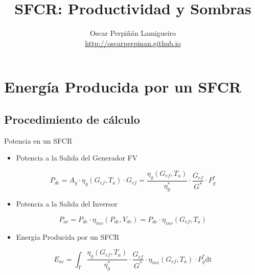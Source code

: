 \documentclass[xcolor={usenames,svgnames,dvipsnames}]{beamer}
\author{Oscar Perpiñán Lamigueiro \\ \url{http://oscarperpinan.github.io}}
\date{}
\title{SFCR: Productividad y Sombras}
\begin{document}
\maketitle

\section{Energía Producida por un SFCR}
\label{sec-1}

\subsection{Procedimiento de cálculo}
\label{sec-1-1}

\begin{frame}[label=sec-1-1-1]{Potencia en un SFCR}
\begin{itemize}
\item Potencia a la Salida del Generador FV
\end{itemize}

$$P_{dc} = A_g \cdot \eta_g(G_{ef}, T_a) \cdot  G_{ef} = %
      \frac{\eta_g(G_{ef}, T_a)}{\eta_g^*} \cdot \frac{G_{ef}}{G^*} \cdot P_g^*$$

\begin{itemize}
\item Potencia a la Salida del Inversor
\end{itemize}

$$P_{ac} = P_{dc} \cdot \eta_{inv}(P_{dc}, V_{dc}) =  P_{dc} \cdot \eta_{inv}(G_{ef}, T_a)$$

\begin{itemize}
\item Energía Producida por un SFCR
\end{itemize}

$$E_{ac} = \int_T \frac{\eta_g(G_{ef}, T_a)}{\eta_g^*} \cdot
      \frac{G_{ef}}{G^*} \cdot \eta_{inv}(G_{ef}, T_a) \cdot P_g^* \mathrm{dt}$$
\end{frame}
\end{document}
